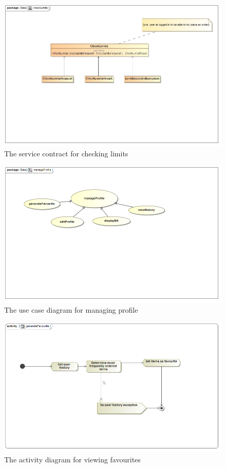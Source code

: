 \documentclass[a4paper,12pt]{article}
\begin{document}
\begin{figure}[H]
	\centering
	\includegraphics[width=1.0\textwidth]{images/checkLimitsSC.jpg}
	\caption{The service contract for checking limits}
\end{figure}

\begin{figure}[H]
  \centering
    \includegraphics[width=1.0\textwidth]{images/manageProfile.png}
    \caption{The use case diagram for managing profile} 
\end{figure}

\begin{figure}[H]
  \centering
    \includegraphics[width=1.0\textwidth]{images/generateFavourite.png}
    \caption{The activity diagram for viewing favourites} 
\end{figure}
\end{document}
